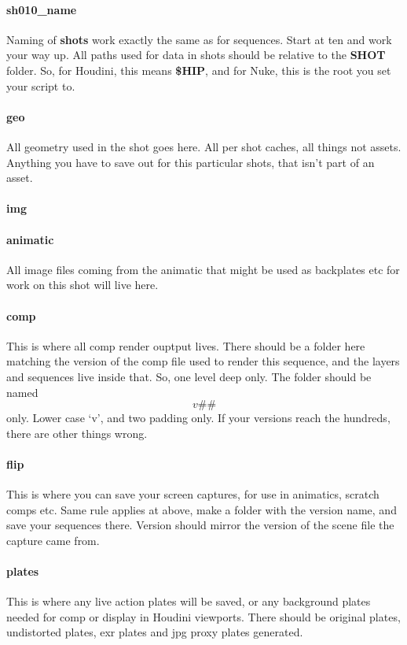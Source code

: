 \paragraph{sh010\_name}
Naming of \textbf{shots} work exactly the same as for sequences. Start at ten and work your way up. All paths used for data in shots should be relative to the \textbf{SHOT} folder. So, for Houdini, this means \textbf{\$HIP}, and for Nuke, this is the root you set your script to. 
\paragraph{geo}
All geometry used in the shot goes here. All per shot caches, all things not assets. Anything you have to save out for this particular shots, that isn't part of an asset. 
\paragraph{img}
\paragraph{animatic}
All image files coming from the animatic that might be used as backplates etc for work on this shot will live here.
\paragraph{comp}
This is where all comp render ouptput lives. There should be a folder here matching the version of the comp file used to render this sequence, and the layers and sequences live inside that. So, one level deep only. The folder should be named \texttt{\[v\#\#\]} only. Lower case \lq v\rq, and two padding only. If your versions reach the hundreds, there are other things wrong. 
\paragraph{flip}
This is where you can save your screen captures, for use in animatics, scratch comps etc. Same rule applies at above, make a folder with the version name, and save your sequences there. Version should mirror the version of the scene file the capture came from.
\paragraph{plates}
This is where any live action plates will be saved, or any background plates needed for comp or display in Houdini viewports. There should be original plates, undistorted plates, exr plates and jpg proxy plates generated.
